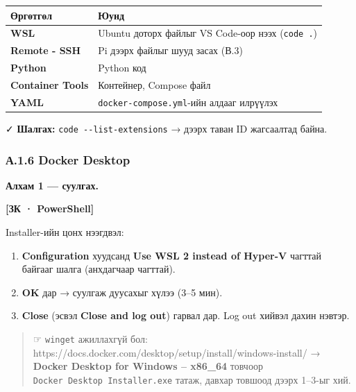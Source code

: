 \begingroup\scriptsize\begin{longtable}[]{@{}ll@{}}
\toprule
Өргөтгөл & Юунд\tabularnewline
\midrule
\endhead
\textbf{WSL} & Ubuntu доторх файлыг VS Code-оор нээх (\texttt{code\ .})\tabularnewline
\textbf{Remote - SSH} & Pi дээрх файлыг шууд засах (В.3)\tabularnewline
\textbf{Python} & Python код\tabularnewline
\textbf{Container Tools} & Контейнер, Compose файл\tabularnewline
\textbf{YAML} & \texttt{docker-compose.\allowbreak{}yml}-ийн алдааг илрүүлэх\tabularnewline
\bottomrule
\end{longtable}\endgroup

✓ \textbf{Шалгах:} \texttt{code\ -\/\allowbreak{}-list-extensions} → дээрх таван ID жагсаалтад байна.

\hypertarget{ux430.1.6-docker-desktop}{%
\subsubsection{А.1.6 Docker Desktop}\label{ux430.1.6-docker-desktop}}

\textbf{Алхам 1 --- суулгах.}

\textbf{{[}ЗК · PowerShell{]}}

\begin{Shaded}
\begin{Highlighting}[]
\end{Highlighting}
\end{Shaded}

Installer-ийн цонх нээгдвэл:

\begin{enumerate}
\def\labelenumi{\arabic{enumi}.}
\tightlist
\item
  \textbf{Configuration} хуудсанд \textbf{Use WSL 2 instead of Hyper-V} чагттай байгааг шалга (анхдагчаар чагттай).
\item
  \textbf{OK} дар → суулгаж дуусахыг хүлээ (3--5 мин).
\item
  \textbf{Close} (эсвэл \textbf{Close and log out}) гарвал дар. Log out хийвэл дахин нэвтэр.
\end{enumerate}

\begin{quote}
☞ \texttt{winget} ажиллахгүй бол: https://docs.docker.com/desktop/setup/install/windows-install/ → \textbf{Docker Desktop for Windows -- x86\_64} товчоор \texttt{Docker\ Desktop\ Installer.\allowbreak{}exe} татаж, давхар товшоод дээрх 1--3-ыг хий.
\end{quote}

